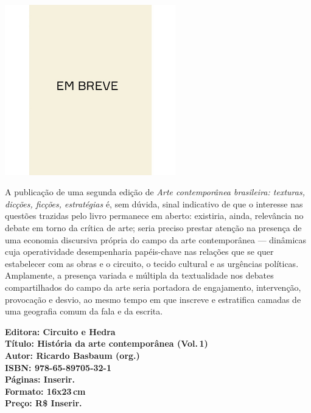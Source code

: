 \pagestyle{circuito}
\label{circuito}

\begin{center}
\hspace*{.5cm}\includegraphics[width=74mm]{./CAPAS/breve.jpeg}
\end{center}
\hspace*{-7cm}\hrulefill\hspace*{-7cm}
\medskip

\noindent{}A publicação de uma segunda edição de \textit{Arte contemporânea brasileira: texturas, dicções, ficções, estratégias} é, sem dúvida, sinal indicativo de que o interesse nas questões trazidas pelo livro permanece em aberto: existiria, ainda, relevância no debate em torno da crítica de arte; seria preciso prestar atenção na presença de uma economia discursiva própria do campo da arte contemporânea --- dinâmicas cuja operatividade desempenharia papéis-chave nas relações que se quer estabelecer com as obras e o circuito, o tecido cultural e as urgências políticas. Amplamente, a presença variada e múltipla da textualidade nos debates compartilhados do campo da arte seria portadora de engajamento, intervenção, provocação e desvio, ao mesmo tempo em que inscreve e estratifica camadas de uma geografia comum da fala e da escrita.

\vfill
\noindent\begin{minipage}[c]{1\linewidth}
{\small\textbf{
\hspace*{-.1cm}Editora: Circuito e Hedra\\
Título: História da arte contemporânea (Vol.\,1)\\
Autor: Ricardo Basbaum (org.)\\ 
ISBN: 978-65-89705-32-1\\
Páginas: Inserir.\\
Formato: 16x23\,cm\\
Preço: R\$ Inserir.\\
}}
\end{minipage}
\pagebreak

